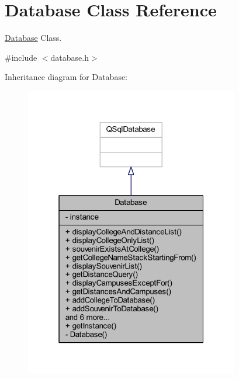 \hypertarget{class_database}{}\section{Database Class Reference}
\label{class_database}


\hyperlink{class_database}{Database} Class.  




{\ttfamily \#include $<$database.\+h$>$}



Inheritance diagram for Database\+:
\nopagebreak
\begin{figure}[H]
\begin{center}
\leavevmode
\includegraphics[width=265pt]{class_database__inherit__graph}
\end{center}
\end{figure}


